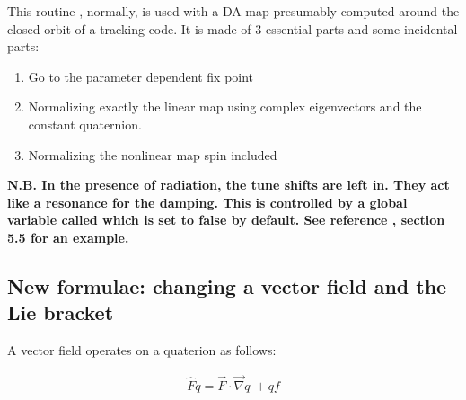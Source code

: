 \documentclass{hitec}     %
\begin{document}
{{{{{{This routine  , normally, is used with a DA map presumably computed around the closed orbit of a tracking code.  It is made of 3 essential parts and some incidental parts:

\begin{enumerate}
\item Go to the parameter dependent fix point 
\item Normalizing exactly the linear map using complex eigenvectors  and the constant quaternion.
\item Normalizing the nonlinear map spin included
\end{enumerate}

{\bf N.B. In the presence of radiation, the tune shifts are left in. They act like a resonance for the damping. This is controlled by a global variable called  which is set to false by default. See reference \cite{thenewbook}, section 5.5 for an example.}


\subsection{New formulae: changing a vector field and the  Lie bracket}\label{s:liebrav}

A vector field operates on a quaterion as follows:

%
\begin{align} \widehat{F}q=
\vec{F}\cdot \vec{\nabla }q\ +qf  \label{hopq0}\end{align}


}}}}}}
\end{document}
